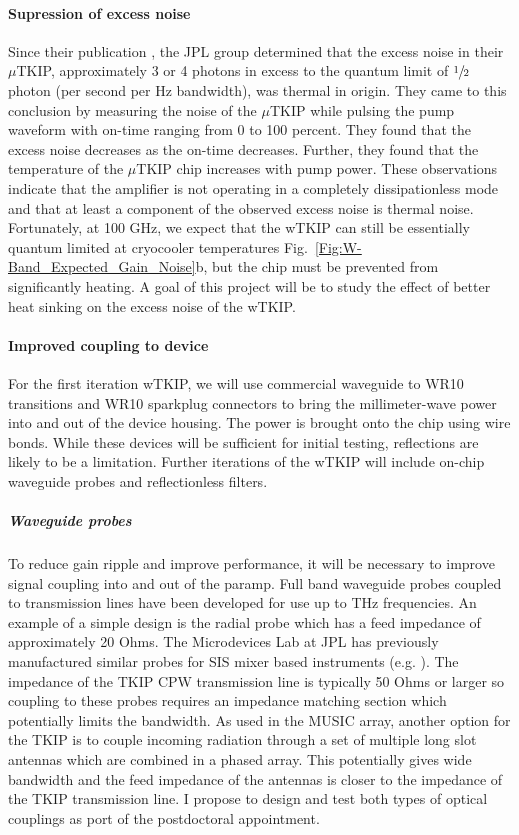 \paragraph*{Supression of excess noise}
Since their publication \cite{Eom2012}, the JPL group determined that the excess noise in their $\mu$TKIP, approximately 3 or 4 photons in excess to the quantum limit of $\sfrac{1}{2}$ photon (per second per Hz bandwidth), was thermal in origin. They came to this conclusion by measuring the noise of the $\mu$TKIP while pulsing the pump waveform with on-time ranging from 0 to 100 percent.  They found that the excess noise decreases as the on-time decreases. Further, they found that the temperature of the $\mu$TKIP chip increases with pump power. These observations indicate that the amplifier is not operating in a completely dissipationless mode and that at least a component of the observed excess noise is thermal noise. Fortunately, at 100 GHz, we expect that the wTKIP can still be essentially quantum limited at cryocooler temperatures Fig.~\ref{Fig:W-Band_Expected_Gain_Noise}b, but the chip must be prevented from significantly heating. A goal of this project will be to study the effect of better heat sinking on the excess noise of the wTKIP.


\paragraph*{Improved coupling to device} For the first iteration wTKIP, we will use commercial waveguide to WR10 transitions and WR10 sparkplug connectors to bring the millimeter-wave power into and out of the device housing. The power is brought onto the chip using wire bonds. While these devices will be sufficient for initial testing, reflections are likely to be a limitation. Further iterations of the wTKIP will include on-chip waveguide probes and reflectionless filters.

\subparagraph*{Waveguide probes} To reduce gain ripple and improve performance, it will be necessary to improve signal coupling into and out of the paramp. Full band waveguide probes coupled to transmission lines have been developed for use up to THz frequencies. An example of a simple design is the radial probe \cite{Withington1996} which has a feed impedance of approximately 20 Ohms. The Microdevices Lab at JPL has previously manufactured similar probes for SIS mixer based instruments (e.g. \cite{Kooi2003}). The impedance of the TKIP CPW transmission line is typically 50 Ohms or larger so coupling to these probes requires an impedance matching section which potentially limits the bandwidth. As used in the MUSIC \cite{Golwala2012} array, another option for the TKIP is to couple incoming radiation through a set of multiple long slot antennas which are combined in a phased array. This potentially gives wide bandwidth and the feed impedance of the antennas is closer to the impedance of the TKIP transmission line. I propose to design and test both types of optical couplings as port of the postdoctoral appointment.

